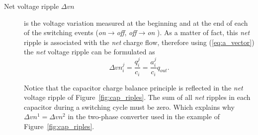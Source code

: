 \begin{description}
  \item[Net voltage ripple $\Delta vn$] is the voltage variation measured at the beginning and at the end of each of the switching events (\emph{on}$\rightarrow$\emph{off}, \emph{off}$\rightarrow$\emph{on} ). As a matter of fact, this \emph{net} ripple is associated with the \emph{net} charge flow, therefore using (\ref{eq:a_vector}) the \emph{net} voltage ripple can be formulated as
       \begin{equation}
        \Delta {vn}^j_i  = \frac{q_i ^j }{c_i} = \frac{a_i ^j }{c_i} {q_{out}}.
        \label{eq:net_voltage_cf}
      \end{equation}

      Notice that the capacitor charge balance principle is reflected in the \emph{net} voltage ripple of Figure~\ref{fig:cap_riples}. The sum of all \emph{net} ripples in each capacitor during a switching cycle  must be zero. Which explains why $\Delta vn^1 = \Delta vn^2$ in the two-phase converter used in the example of Figure~\ref{fig:cap_riples}.


\end{description}
